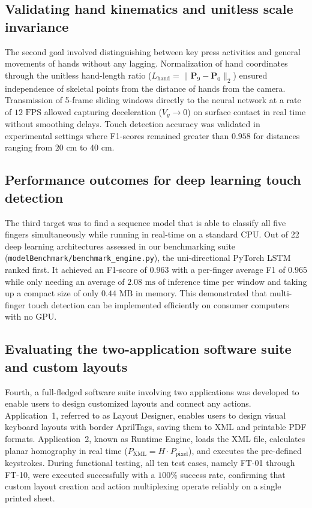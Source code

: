 \subsection{Validating hand kinematics and unitless scale invariance}
\label{subsec:concl_obj2}
The second goal involved distinguishing between key press activities and general movements of hands without any lagging. Normalization of hand coordinates through the unitless hand-length ratio ($L_{\text{hand}} = \|\mathbf{P}_9 - \mathbf{P}_0\|_2$) ensured independence of skeletal points from the distance of hands from the camera. Transmission of 5-frame sliding windows directly to the neural network at a rate of $12\text{ FPS}$ allowed capturing deceleration ($V_y \to 0$) on surface contact in real time without smoothing delays. Touch detection accuracy was validated in experimental settings where F1-scores remained greater than $0.958$ for distances ranging from $20\text{ cm}$ to $40\text{ cm}$.

\subsection{Performance outcomes for deep learning touch detection}
\label{subsec:concl_obj3}
The third target was to find a sequence model that is able to classify all five fingers simultaneously while running in real-time on a standard CPU. Out of 22 deep learning architectures assessed in our benchmarking suite (\texttt{modelBenchmark/benchmark\_engine.py}), the uni-directional PyTorch LSTM ranked first. It achieved an F1-score of $0.963$ with a per-finger average F1 of $0.965$ while only needing an average of $2.08\text{ ms}$ of inference time per window and taking up a compact size of only $0.44\text{ MB}$ in memory. This demonstrated that multi-finger touch detection can be implemented efficiently on consumer computers with no GPU.

\subsection{Evaluating the two-application software suite and custom layouts}
\label{subsec:concl_obj4}
Fourth, a full-fledged software suite involving two applications was developed to enable users to design customized layouts and connect any actions. Application~1, referred to as Layout Designer, enables users to design visual keyboard layouts with border AprilTags, saving them to XML and printable PDF formats. Application~2, known as Runtime Engine, loads the XML file, calculates planar homography in real time ($P_{\text{XML}} = H \cdot P_{\text{pixel}}$), and executes the pre-defined keystrokes. During functional testing, all ten test cases, namely FT-01 through FT-10, were executed successfully with a $100\%$ success rate, confirming that custom layout creation and action multiplexing operate reliably on a single printed sheet.

